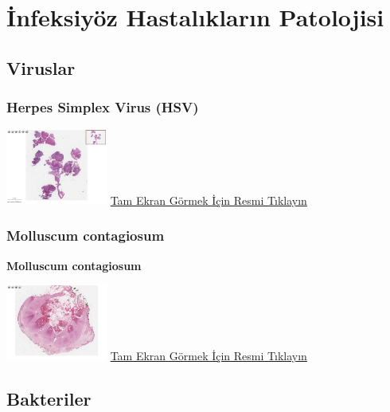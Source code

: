 \documentclass[
  letterpaper,
  DIV=11,
  numbers=noendperiod]{scrreprt}
\begin{document}
\part{İnfeksiyöz Hastalıkların Patolojisi}

\hypertarget{sec-viruslar}{%
\chapter{Viruslar}\label{sec-viruslar}}

\hypertarget{sec-herpes-simplex-virus}{%
\section{Herpes Simplex Virus (HSV)}\label{sec-herpes-simplex-virus}}

\href{https://images.patolojiatlasi.com/HSV/herpesesophagitis/viewer_z0.html}{\includegraphics[width=0.25\textwidth,height=\textheight]{./screenshots/herpesesophagitis_screenshot.png}}
\href{https://images.patolojiatlasi.com/HSV/herpesesophagitis/viewer_z0.html}{Tam
Ekran Görmek İçin Resmi Tıklayın}

\hypertarget{sec-molluscum-contagiosum}{%
\section{Molluscum contagiosum}\label{sec-molluscum-contagiosum}}

\textbf{Molluscum contagiosum}

\href{https://images.patolojiatlasi.com/molluscum-contagiosum/HE.html}{\includegraphics[width=0.25\textwidth,height=\textheight]{./screenshots/molluscum-contagiosum_screenshot.png}}
\href{https://images.patolojiatlasi.com/molluscum-contagiosum/HE.html}{Tam
Ekran Görmek İçin Resmi Tıklayın}

\hypertarget{sec-bakteriler}{%
\chapter{Bakteriler}\label{sec-bakteriler}}
\end{document}
